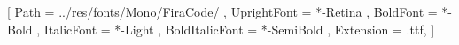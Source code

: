\setmonofont{FiraCode}
[
	Path = ../res/fonts/Mono/FiraCode/ ,
	UprightFont = *-Retina ,
	BoldFont = *-Bold ,
	ItalicFont = *-Light ,
	BoldItalicFont = *-SemiBold ,
	Extension = .ttf,
]